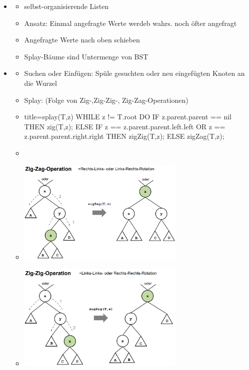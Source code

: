 \documentclass[
    12pt,
    a4paper,
    ngerman,
    color=3b,%
    marginpar=false,
    colorback=false,
    leqno,
]{tudaexercise}
\begin{document}
    \begin{itemize}
        \item {}
            \begin{itemize}
                \item selbst-organisierende Listen
                \item Ansatz: Einmal angefragte Werte werdeb wahrs. noch öfter angefragt
                \item Angefragte Werte nach oben schieben
                \item Splay-Bäume sind Untermenge von BST
            \end{itemize}
        
        \item {}
            \begin{itemize}
                \item Suchen oder Einfügen: Spüle gesuchten oder neu eingefügten Knoten an die Wurzel
                \item Splay: (Folge von Zig-,Zig-Zig-, Zig-Zag-Operationen)
                \item []
                    \begin{ccode}[autogobble]{title={splay(T,z)}}
                    WHILE z != T.root DO
                        IF z.parent.parent == nil THEN
                            zig(T,z);
                        ELSE
                            IF z == z.parent.parent.left.left OR
                               z == z.parent.parent.right.right THEN
                               zigZig(T,z);
                            ELSE
                                zigZag(T,z);
                    \end{ccode}
                \item[]
                \item[] \includegraphics[width=8cm]{pictures/zigzag.PNG}
                \item[] \includegraphics[width=8cm]{pictures/zigzig.PNG}

\end{itemize}
\end{itemize}
\end{document}
